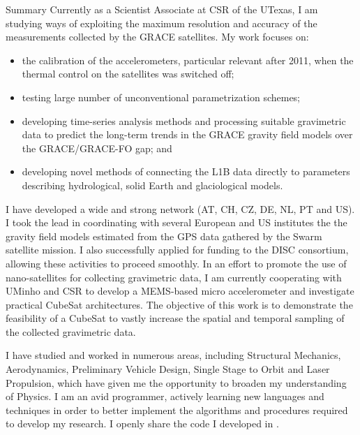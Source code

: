 \begin{cvtext}{Summary}
Currently as a Scientist Associate at \ac{CSR} of the \ac{UTexas}, I am studying ways of exploiting the maximum resolution and accuracy of the measurements collected by the \ac{GRACE} satellites.
My work focuses on:
\begin{itemize}
\item the calibration of the accelerometers, particular relevant after 2011, when the thermal control on the satellites was switched off;
\item testing large number of unconventional parametrization schemes;
\item developing time-series analysis methods and processing suitable gravimetric data to predict the long-term trends in the \ac{GRACE} gravity field models over the \ac{GRACE}\slash\ac{GRACE-FO} gap; and
\item developing novel methods of connecting the L1B data directly to parameters describing hydrological, solid Earth and glaciological models.
\end{itemize}

I have developed a wide and strong network (AT, CH, CZ, DE, NL, PT and US).
I took the lead in coordinating with several European and US institutes the  the gravity field models estimated from the \ac{GPS} data gathered by the Swarm satellite mission.
I also successfully applied for funding to the \ac{DISC} consortium, allowing these activities to proceed smoothly.
In an effort to promote the use of nano-satellites for collecting gravimetric data, I am currently cooperating with \ac{UMinho} and CSR to develop a \ac{MEMS}-based micro accelerometer and investigate practical CubeSat architectures.
The objective of this work is to demonstrate the feasibility of a CubeSat to vastly increase the spatial and temporal sampling of the collected gravimetric data.

I have studied and worked in numerous areas, including Structural Mechanics, Aerodynamics, Preliminary Vehicle Design, Single Stage to Orbit and Laser Propulsion, which have given me the opportunity to broaden my understanding of Physics.
I am an avid programmer, actively learning new languages and techniques in order to better implement the algorithms and procedures required to develop my research.
I openly share the code I developed in .

\end{cvtext}